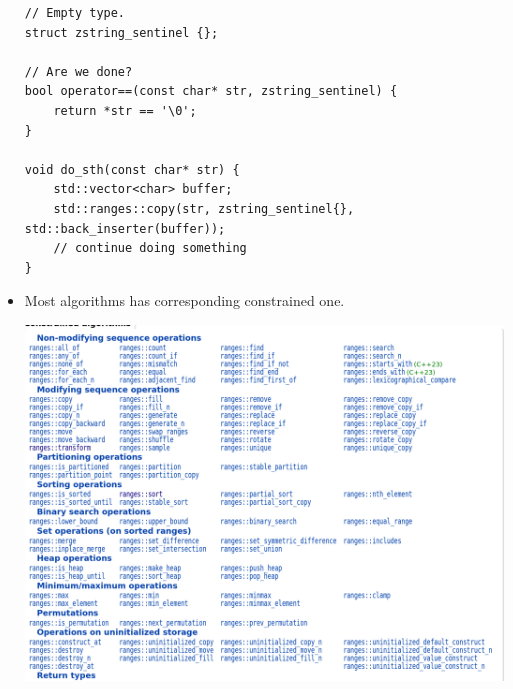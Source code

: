 \documentclass[a4paper,11pt,twoside]{book}
\begin{document}
\begin{itemize}
\begin{lstlisting}
// Empty type.
struct zstring_sentinel {};

// Are we done?
bool operator==(const char* str, zstring_sentinel) {
    return *str == '\0';
}

void do_sth(const char* str) {
    std::vector<char> buffer;
    std::ranges::copy(str, zstring_sentinel{}, std::back_inserter(buffer));
    // continue doing something
}
\end{lstlisting}
\item Most algorithms has corresponding constrained one.
\begin{center}
	\includegraphics[width=0.96\linewidth]{pics/ca.png}
\end{center}


\end{itemize}
\end{document}
